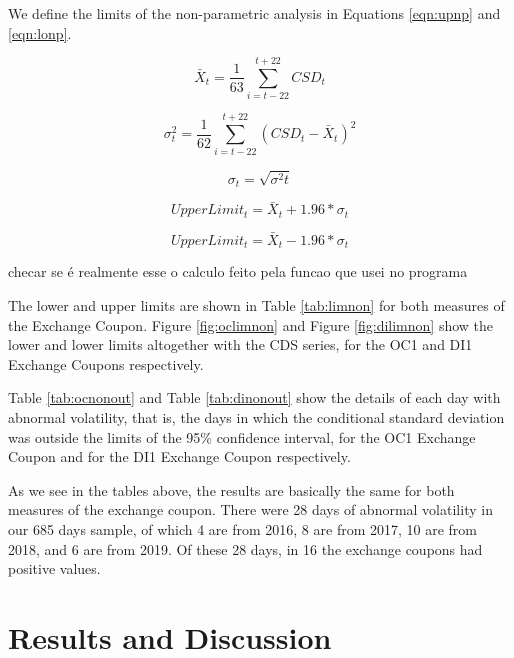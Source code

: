 \documentclass[cic,tc, english]{iiufrgs}
\begin{document}
    We define the limits of the non-parametric analysis in Equations \ref{eqn:upnp} and \ref{eqn:lonp}.

    $$\bar{X}_t = \frac{1}{63} \displaystyle\sum_{i=t-22}^{t+22} CSD_t$$

    $$\sigma^2_t = \frac{1}{62} \displaystyle\sum_{i=t-22}^{t+22} (CSD_t - \bar{X}_t)^2$$

    $$\sigma_t = \sqrt{\sigma^2t}$$

    \begin{equation}
        \label{eqn:upnp}
        UpperLimit_t = \bar{X}_t + 1.96 * \sigma_t
    \end{equation}

    \begin{equation}
        \label{eqn:lonp}
        UpperLimit_t = \bar{X}_t - 1.96 * \sigma_t
    \end{equation}

    {checar se é realmente esse o calculo feito pela funcao que usei no programa}

    The lower and upper limits are shown in Table \ref{tab:limnon} for both measures of the Exchange Coupon. Figure \ref{fig:oclimnon} and Figure \ref{fig:dilimnon} show the lower and lower limits altogether with the CDS series, for the OC1 and DI1 Exchange Coupons respectively.

    

    

    

    Table \ref{tab:ocnonout} and Table \ref{tab:dinonout} show the details of each day with abnormal volatility, that is, the days in which the conditional standard deviation was outside the limits of the 95\% confidence interval, for the OC1 Exchange Coupon and for the DI1 Exchange Coupon respectively.

    

    

    As we see in the tables above, the results are basically the same for both measures of the exchange coupon. There were 28 days of abnormal volatility in our 685 days sample, of which 4 are from 2016, 8 are from 2017, 10 are from 2018, and 6 are from 2019. Of these 28 days, in 16 the exchange coupons had positive values.

\chapter{Results and Discussion} \label{chapter_results_discussion}
\end{document}
